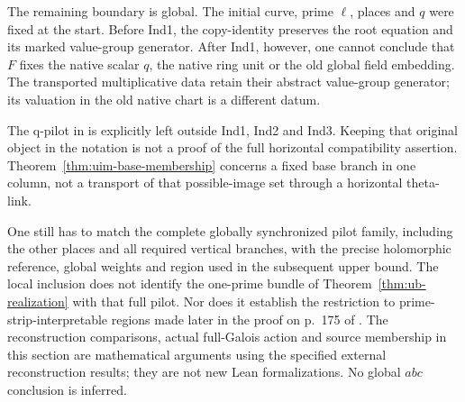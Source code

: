 The remaining boundary is global.
The initial curve, prime
\(\ell\), places and \(q\)
were fixed at the start.
Before Ind1, the copy-identity
preserves the root equation
and its marked value-group
generator. After Ind1, however,
one cannot conclude that
\(F\) fixes the native scalar
\(q\), the native ring unit
or the old global field
embedding. The transported
multiplicative data retain
their abstract value-group
generator; its valuation in
the old native chart is a
different datum.

The q-pilot in
\cite[Corollary~3.12, p.~174]{IUT3}
is explicitly left outside
Ind1, Ind2 and Ind3.
Keeping that original object
in the notation is not a
proof of the full horizontal
compatibility assertion.
Theorem~\ref{thm:uim-base-membership}
concerns a fixed base branch
in one column, not a transport
of that possible-image set
through a horizontal
theta-link.

One still has to match the
complete globally synchronized
pilot family, including the
other places and all required
vertical branches, with the
precise holomorphic reference,
global weights and region
used in the subsequent upper
bound. The local inclusion
does not identify the
one-prime bundle of
Theorem~\ref{thm:ub-realization}
with that full pilot.
Nor does it establish the
restriction to prime-strip-interpretable
regions made later in the
proof on p.~175 of
\cite{IUT3}.
The reconstruction comparisons,
actual full-Galois action
and source membership in
this section are mathematical
arguments using the specified
external reconstruction
results; they are not new
Lean formalizations.
No global \(abc\) conclusion
is inferred.
